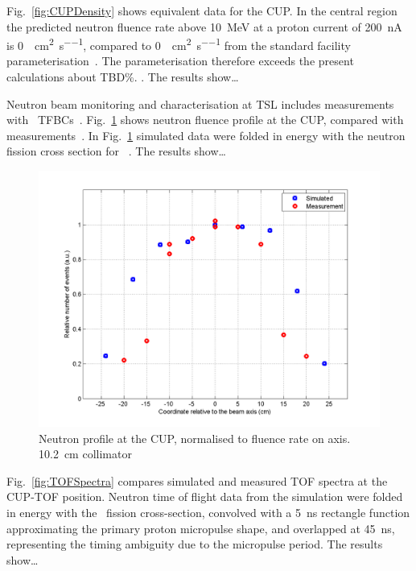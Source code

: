\documentclass[11pt,a4paper]{IEEEtran}
\let\MYoriglatexcaption\caption
\renewcommand{\caption}[2][\relax]{\MYoriglatexcaption[#2]{#2}}
\def\U238{\BPChem{\^{238}U}}
\begin{document}
Fig.~\ref{fig:CUPDensity} shows equivalent data for the CUP.
In the central region the predicted neutron fluence rate above \SI{10}{\MeV} at a proton current of \SI{200}{\nA} is \SI{0}{\neutron\per\cm\squared\per\second}, compared to \SI{0}{\neutron\per\cm\squared\per\second} from the standard facility parameterisation~\cite{Prokofiev14}.
The parameterisation therefore exceeds the present calculations about TBD\%.
.
The results show\ldots
{}

Neutron beam monitoring and characterisation at TSL includes measurements with \U238\ TFBCs~\cite{Prokofiev14}.
Fig.~\ref{fig:CUPProfile} shows neutron fluence profile at the CUP, compared with measurements~\cite{Prokofiev14}.
In Fig.~\ref{fig:CUPProfile} simulated data were folded in energy with the neutron fission cross section for \U238~\cite{tbd}.
The results show\ldots
{}

\begin{figure}[t]
    \centering
    \includegraphics[width=\columnwidth]{CUPTOF10beamproRADECS.png}
    \caption{
        Neutron profile at the CUP, normalised to fluence rate on axis.
        \SI{10.2}{\cm} collimator}
    \label{fig:CUPProfile}
\end{figure}

Fig.~\ref{fig:TOFSpectra} compares simulated and measured TOF spectra at the CUP-TOF position.
Neutron time of flight data from the simulation were folded in energy with the \U238\ fission cross-section, convolved with a \SI{5}{\ns} rectangle function approximating the primary proton micropulse shape, and overlapped at \SI{45}{\ns}, representing the timing ambiguity due to the micropulse period.
The results show\ldots
{}
\end{document}
